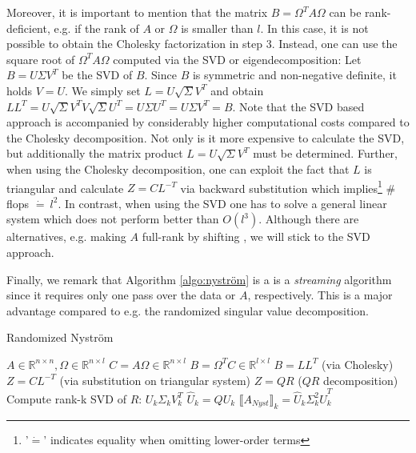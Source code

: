 \documentclass{article}
\theoremstyle{definition}
\begin{document}
Moreover, it is important to mention that the matrix $B = \Omega^T A \Omega$ can
be rank-deficient, e.g. if the rank of $A$ or $\Omega$ is smaller than $l$. In
this case, it is not possible to obtain the Cholesky factorization in step 3.
Instead, one can use the square root of $\Omega^T A \Omega$ computed via the SVD
or eigendecomposition: Let $B = U \Sigma V^T$ be the SVD of $B$. Since $B$ is
symmetric and non-negative definite, it holds $V = U$. We simply set $L = U
\sqrt{\Sigma} V^T$ and obtain $LL^T = U \sqrt{\Sigma} V^T V \sqrt{\Sigma} U^T =
U \Sigma U^T = U \Sigma V^T = B$. Note that the SVD based approach is
accompanied by considerably higher computational costs compared to the Cholesky
decomposition. Not only is it more expensive to calculate the SVD, but
additionally the matrix product $L = U \sqrt{\Sigma} V^T$ must be determined.
Further, when using the Cholesky decomposition, one can exploit the fact that
$L$ is triangular and calculate $Z = C L^{-T}$ via backward substitution which
implies\footnote{'$\dot{=}$' indicates equality when omitting lower-order terms}
\# flops $\dot{=}\ l^2$. In contrast, when using the SVD one has to solve a
general linear system which does not perform better than $O(l^3)$. Although
there are alternatives, e.g. making $A$ full-rank by shifting
\cite{tropp2017fixedrank}, we will stick to the SVD approach.\newline

Finally, we remark that Algorithm \ref{algo:nyström} is a is a
\textit{streaming} algorithm since it requires only one pass over the data or
$A$, respectively. This is a major advantage compared to e.g. the randomized
singular value decomposition.
\begin{algorithm}[t]
    \caption{Randomized Nyström} \label{algo:nyström}
    \begin{algorithmic}[1]
        \Require $A \in \mathbb{R}^{n \times n}, \Omega \in
                    \mathbb{R}^{n \times l}$
        \State $C = A \Omega \in \mathbb{R}^{n \times l}$
        \State $B = \Omega^T C \in \mathbb{R}^{l \times l}$
        \State $B = LL^T$ (via Cholesky)
        \State $Z = C L^{-T}$ (via substitution on triangular system)
        \State $Z = QR$ ($QR$ decomposition)
        \State Compute rank-k SVD of $R$: $U_k \Sigma_k V_k^T$
        \State $\hat{U}_k = Q U_k$
        \Ensure $\llbracket A_{Nyst}\rrbracket_k = \hat{U}_k \Sigma_k^2
                \hat{U}_k^T$
    \end{algorithmic}
\end{algorithm}
\end{document}
